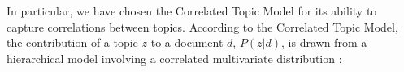 \documentclass[smallextended]{svjour3}
\begin{document}

In particular, we have chosen the Correlated Topic Model for its ability to capture correlations between topics. According to the Correlated Topic Model, the contribution of a topic $z$ to a document $d$, $P(z|d)$, is drawn from a hierarchical model involving a correlated multivariate distribution \citep{Blei2007}:%
\end{document}
